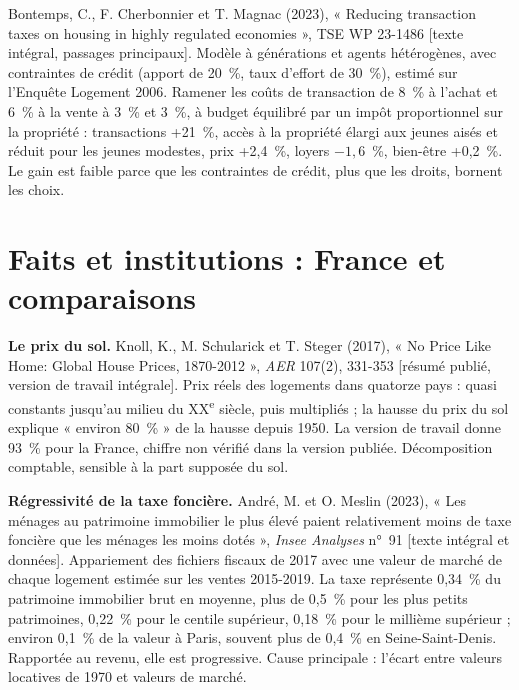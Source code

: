 \documentclass[11pt,a4paper]{article}
\newcommand{\lu}[1]{{\footnotesize\color{ocre}[#1]}}
\begin{document}
Bontemps, C., F. Cherbonnier et T. Magnac (2023), « Reducing transaction taxes on housing in highly
regulated economies », TSE WP 23-1486 \lu{texte intégral, passages principaux}. Modèle à
générations et agents hétérogènes, avec contraintes de crédit (apport de 20~\%, taux d'effort de
30~\%), estimé sur l'Enquête Logement 2006. Ramener les coûts de transaction de 8~\% à l'achat et
6~\% à la vente à 3~\% et 3~\%, à budget équilibré par un impôt proportionnel sur la propriété :
transactions +21~\%, accès à la propriété élargi aux jeunes aisés et réduit pour les jeunes
modestes, prix +2,4~\%, loyers $-1{,}6$~\%, bien-être +0,2~\%. Le gain est faible parce que les
contraintes de crédit, plus que les droits, bornent les choix.

\section{Faits et institutions : France et comparaisons}

\textbf{Le prix du sol.} Knoll, K., M. Schularick et T. Steger (2017), « No Price Like Home: Global
House Prices, 1870-2012 », \emph{AER} 107(2), 331-353 \lu{résumé publié, version de travail
intégrale}. Prix réels des logements dans quatorze pays : quasi constants jusqu'au milieu du
XX\textsuperscript{e} siècle, puis multipliés ; la hausse du prix du sol explique « environ
80~\% » de la hausse depuis 1950. La version de travail donne 93~\% pour la France, chiffre non
vérifié dans la version publiée. Décomposition comptable, sensible à la part supposée du sol.

\textbf{Régressivité de la taxe foncière.} André, M. et O. Meslin (2023), « Les ménages au
patrimoine immobilier le plus élevé paient relativement moins de taxe foncière que les ménages les
moins dotés », \emph{Insee Analyses} n°~91 \lu{texte intégral et données}. Appariement des
fichiers fiscaux de 2017 avec une valeur de marché de chaque logement estimée sur les ventes
2015-2019. La taxe représente 0,34~\% du patrimoine immobilier brut en moyenne, plus de 0,5~\%
pour les plus petits patrimoines, 0,22~\% pour le centile supérieur, 0,18~\% pour le millième
supérieur ; environ 0,1~\% de la valeur à Paris, souvent plus de 0,4~\% en Seine-Saint-Denis.
Rapportée au revenu, elle est progressive. Cause principale : l'écart entre valeurs locatives de
1970 et valeurs de marché.
\end{document}
